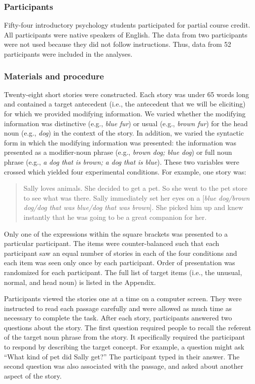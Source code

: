 \documentclass[output=paper]{langsci/langscibook}
\begin{document}
\subsubsection{Participants}

Fifty-four introductory psychology students participated for partial
course credit. All participants were native speakers of English. The
data from two participants were not used because they did not follow
instructions. Thus, data from 52 participants were included in the
analyses.

\subsubsection{Materials and procedure}

Twenty-eight short stories were constructed. Each story was under 65
words long and contained a target antecedent (i.e., the antecedent
that we will be eliciting) for which we provided modifying
information. We varied whether the modifying information was
distinctive (e.g., \textit{blue fur}) or usual (e.g., \textit{brown
  fur}) for the head noun (e.g., \textit{dog}) in the context of the
story. In addition, we varied the syntactic form in which the
modifying information was presented: the information was presented as
a modifier-noun phrase (e.g., \textit{brown dog; blue dog}) or full
noun phrase (e.g., \textit{a dog that is brown; a dog that is
  blue}). These two variables were crossed which yielded four
experimental conditions. For example, one story was: 

\begin{quote}Sally loves
animals. She decided to get a pet. So she went to the pet store to see
what was there.  Sally immediately set her eyes on a [\textit{blue
  dog/brown dog/dog that was blue/dog that was brown}].  She picked
him up and knew instantly that he was going to be a great companion
for her.\end{quote} Only one of the expressions within the square brackets was
presented to a particular participant. The items were counter-balanced
such that each participant saw an equal number of stories in each of
the four conditions and each item was seen only once by each
participant. Order of presentation was randomized for each
participant. The full list of target items (i.e., the unusual, normal,
and head noun) is listed in the Appendix.

Participants viewed the stories one at a time on a computer
screen. They were instructed to read each passage carefully and were
allowed as much time as necessary to complete the task.  After each
story, participants answered two questions about the story. The first
question required people to recall the referent of the target noun
phrase from the story. It specifically required the participant to
respond by describing the target concept. For example, a question
might ask ``What kind of pet did Sally get?'' The participant
typed in their answer. The second question was also associated with
the passage, and asked about another aspect of the story.
\end{document}
